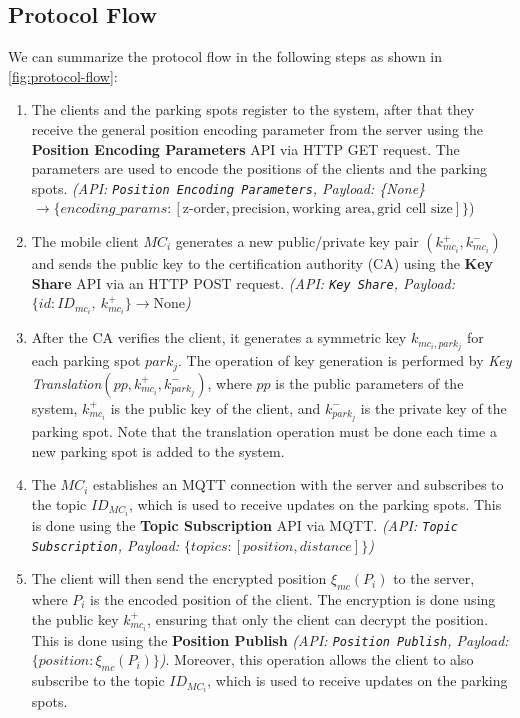 \subsection{Protocol Flow}

We can summarize the protocol flow in the following steps as shown in \cref{fig:protocol-flow}:

\begin{enumerate}
    \item The clients and the parking spots register to the system, after that they receive the general position encoding parameter from the server using the \textbf{Position Encoding Parameters} API via HTTP GET request. The parameters are used to encode the positions of the clients and the parking spots. \emph{(API: \texttt{Position Encoding Parameters}, Payload: \{None\} $\to \{encoding\_params: [\text{z-order}, \text{precision}, \text{working area}, \text{grid cell size}]\}$})
    \item The mobile client $MC_i$ generates a new public/private key pair $(k_{mc_i}^+, k_{mc_i}^-)$ and sends the public key to the certification authority (CA) using the \textbf{Key Share} API via an HTTP POST request. \emph{(API: \texttt{Key Share}, Payload: $\{id: ID_{mc_i},\ k_{mc_i}^+\} \to { \text{None} }$)}
    \item After the CA verifies the client, it generates a symmetric key $k_{mc_i, park_j}$ for each parking spot $park_j$. The operation of key generation is performed by \emph{Key Translation}$(pp, k_{mc_i}^+, k_{park_j}^-)$, where $pp$ is the public parameters of the system, $k_{mc_i}^+$ is the public key of the client, and $k_{park_j}^-$ is the private key of the parking spot. Note that the translation operation must be done each time a new parking spot is added to the system.
    \item The $MC_i$ establishes an MQTT connection with the server and subscribes to the topic $ID_{MC_i}$, which is used to receive updates on the parking spots. This is done using the \textbf{Topic Subscription} API via MQTT. \emph{(API: \texttt{Topic Subscription}, Payload: $\{topics: [position, distance]\}$)}
    \item The client will then send the encrypted position $\xi_{mc}(P_i)$ to the server, where $P_i$ is the encoded position of the client. The encryption is done using the public key $k_{mc_i}^+$, ensuring that only the client can decrypt the position. This is done using the \textbf{Position Publish} \emph{(API: \texttt{Position Publish}, Payload: $\{position: \xi_{mc}(P_i)\}$)}. Moreover, this operation allows the client to also subscribe to the topic $ID_{MC_i}$, which is used to receive updates on the parking spots.

\end{enumerate}
